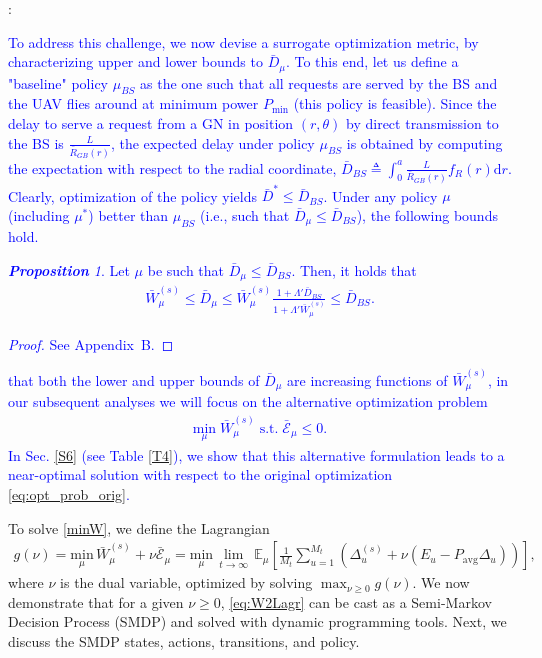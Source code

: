 \documentclass[12pt, draftcls, onecolumn]{IEEEtran}
\theoremstyle{plain}
\theoremstyle{definition}
\theoremstyle{remark}
\newtheorem{prop}{\textbf{Proposition}}
\newcommand\hlt[1]{\textcolor{blue}{#1}}
\begin{document}
\noindent{\textbf{\hlt{Alternative Problem Formulation}}}:\label{altopt} \hlt{
To address this challenge, we now devise a surrogate optimization metric, by characterizing upper and lower bounds to $\bar D_{\mu}$. To this end, let us define a "baseline" policy $\mu_{BS}$ as the one such that all requests are served by the BS and the UAV flies around at minimum power $P_{\min}$ (this policy is feasible). Since the delay to serve a request from a GN in position $(r,\theta)$ by direct transmission to the BS is $\frac{L}{\bar R_{GB}(r)}$,  the expected delay under policy $\mu_{BS}$ is obtained by computing the expectation with respect to the radial coordinate, $\bar{D}_{BS}{\triangleq}\int_{0}^{a}\frac{L}{\bar{R}_{GB}(r)}f_{R}(r)\mathrm{d}r$. Clearly, optimization of the policy yields $\bar{D}^{*}{\leq}\bar{D}_{BS}$. Under any policy $\mu$ (including $\mu^*$) better than 
$\mu_{BS}$ (i.e., such that $\bar{D}_{\mu}\leq\bar{D}_{BS}$), the following bounds hold.
\begin{prop}\label{P2}
    Let $\mu$ be such that $\bar{D}_{\mu}\leq\bar{D}_{BS}$. Then, it holds that
    \begin{align}\label{bounds}
        \bar{W}_{\mu}^{(s)} \leq \bar{D}_{\mu} \leq \bar{W}_{\mu}^{(s)} \frac{1 + \Lambda' \bar{D}_{BS}}{1 + \Lambda' \bar{W}_{\mu}^{(s)}} \leq \bar{D}_{BS}.
    \end{align}
\end{prop}
\begin{proof}
    See Appendix~B.
\end{proof}
\noindent{Noticing} that both the lower and upper bounds of $\bar{D}_{\mu}$ are increasing functions of $\bar{W}_{\mu}^{(s)}$, in our subsequent analyses we will focus on the alternative  optimization problem
\begin{align}
\label{minW}
   \underset{\mu}{\mathrm{min}} \; \bar{W}_{\mu}^{(s)} \; \mathrm{ s.t. } \; \bar{\mathcal E}_{\mu} \leq 0.
\end{align}
In Sec. \ref{S6} (see Table \ref{T4}), we show that this alternative formulation leads to a near-optimal solution with respect to the original optimization \eqref{eq:opt_prob_orig}.}
To solve \eqref{minW}, we define the Lagrangian
\begin{align}\label{eq:W2Lagr}
    g(\nu) = \underset{\mu}{\mathrm{min}}\, \bar{W}_{\mu}^{(s)} + \nu\bar{\mathcal E}_{\mu} = \underset{\mu}{\mathrm{min}}\, \lim_{t\rightarrow\infty} \, \mathbb{E}_{\mu} \left[\frac{1}{M_t} \sum_{u=1}^{M_t}\left(\Delta_u^{(s)} + \nu (E_u{-}P_{\mathrm{avg}}\Delta_u)\right)\right],
\end{align}
where $\nu$ is the dual variable, optimized by solving $\max_{\nu{\geq}0}g(\nu)$. We now demonstrate that for a given $\nu{\geq}0$, \eqref{eq:W2Lagr} can be cast as a Semi-Markov Decision Process (SMDP) and solved with dynamic programming tools. Next, we discuss the SMDP states, actions, transitions, and policy. 
\end{document}
